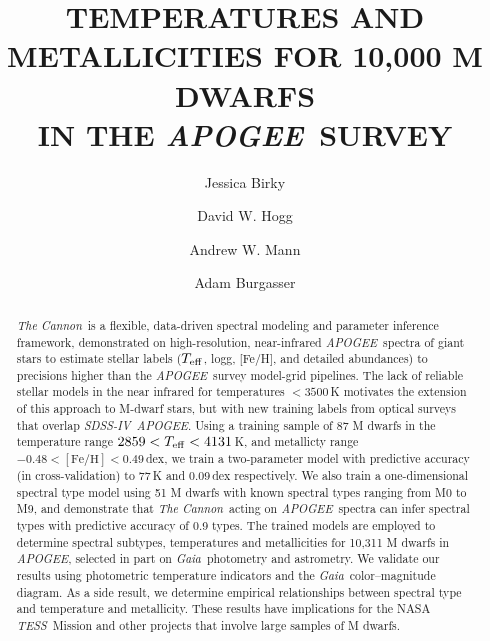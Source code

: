\documentclass[modern]{aastex62}
\newcommand{\apogee}{\textsl{APOGEE}}
\newcommand{\thecannon}{\textsl{The Cannon}}
\newcommand{\gaia}{\textsl{Gaia}}
\newcommand{\sdssiv}{\textsl{SDSS-IV}}
\newcommand{\tess}{\textsl{TESS}}
\newcommand{\teff}{$T_{\rm eff}$}
\begin{document}
\title{TEMPERATURES AND METALLICITIES FOR 10,000 M DWARFS\\ IN THE \apogee\ SURVEY}


\author[0000-0002-7961-6881]{Jessica Birky}

\author[0000-0003-2866-9403]{David W. Hogg}

\author[0000-0003-3654-1602]{Andrew W. Mann}

\author[0000-0002-6523-9536]{Adam Burgasser}

\begin{abstract}
\thecannon\ is a flexible, data-driven spectral modeling and parameter inference framework, demonstrated on high-resolution, near-infrared \apogee\ spectra of giant stars to estimate stellar labels (\teff, logg, [Fe/H], and detailed abundances) to precisions higher than the \apogee\ survey model-grid pipelines.
The lack of reliable stellar models in the near infrared for temperatures $<3500$\,K motivates the extension of this approach to M-dwarf stars, but with new training labels from optical surveys that overlap \sdssiv\ \apogee.
Using a training sample of 87 M dwarfs in the temperature range $2859 < T_{\rm eff} < 4131$\,K, and metallicty range $-0.48 < \mathrm{[Fe/H]}< 0.49$\,dex, we train a two-parameter model with predictive accuracy (in cross-validation) to 77\,K and 0.09\,dex respectively.
We also train a one-dimensional spectral type model using 51 M dwarfs with known spectral types ranging from M0 to M9, and demonstrate that \thecannon\ acting on \apogee\ spectra can infer spectral types with predictive accuracy of 0.9 types.
The trained models are employed to determine spectral subtypes, temperatures and metallicities for 10,311 M dwarfs in \apogee, selected in part on \gaia\ photometry and astrometry.
We validate our results using photometric temperature indicators and the \gaia\ color--magnitude diagram.
As a side result, we determine empirical relationships between spectral type and temperature and metallicity.
These results have implications for the NASA \tess\ Mission and other projects that involve large samples of M dwarfs.
\end{abstract}
\end{document}
